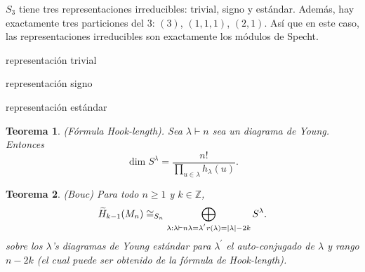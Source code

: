 \documentclass[12pt]{book}
\newtheorem{theorem}{Teorema}[section]
\theoremstyle{definition}
\newcounter{in}
\begin{document}
$S_{3}$ tiene tres representaciones irreducibles: trivial,
signo y estándar. Además, hay exactamente tres particiones del $3$: $(3)$, $(1,1,1)$,
$(2,1)$. Así que en este caso, las representaciones irreducibles son
exactamente los módulos de Specht. 

\begin{center}

representación trivial


representación signo


representación estándar
\end{center}

\begin{theorem}{(Fórmula Hook-length).} 
  Sea $\lambda\vdash n$ sea un diagrama de Young. Entonces
  $$\dim S^{\lambda}=\frac{n!}{\prod_{u\in \lambda}h_{\lambda}(u)}.$$
\end{theorem}
 
\begin{theorem}(Bouc)
  Para todo $n\geq1$ y $k\in \mathbb{Z}$,
  \begin{equation*}
    \widetilde H_{k-1}(M_{n})\cong_{S_{n}}\bigoplus_{\lambda:\lambda\vdash n\\
      \lambda=\lambda^{'}\\r(\lambda)=\mid \lambda \mid-2k} S^{\lambda}.
  \end{equation*}
  sobre los $\lambda$'s diagramas de Young estándar para $\lambda^{'}$
  el auto-conjugado de $\lambda$ y rango $n-2k$ (el cual puede ser
  obtenido de la fórmula de Hook-length).
\end{theorem}



% 

% 

\printindex
\end{document}

